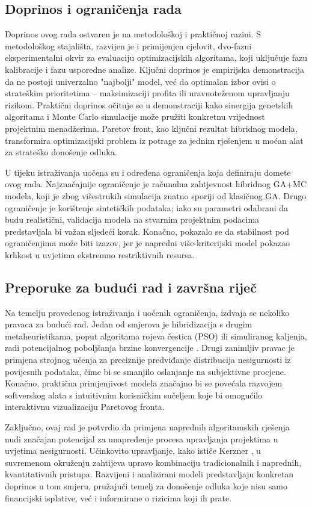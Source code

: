 \subsection{Doprinos i ograničenja rada}

Doprinos ovog rada ostvaren je na metodološkoj i praktičnoj razini. S metodološkog stajališta, razvijen je i primijenjen cjelovit, dvo-fazni eksperimentalni okvir za evaluaciju optimizacijskih algoritama, koji uključuje fazu kalibracije i fazu usporedne analize. Ključni doprinos je empirijska demonstracija da ne postoji univerzalno "najbolji" model, već da optimalan izbor ovisi o strateškim prioritetima – maksimizaciji profita ili uravnoteženom upravljanju rizikom. Praktični doprinos očituje se u demonstraciji kako sinergija genetskih algoritama i Monte Carlo simulacije može pružiti konkretnu vrijednost projektnim menadžerima. Paretov front, kao ključni rezultat hibridnog modela, transformira optimizacijski problem iz potrage za jednim rješenjem u moćan alat za strateško donošenje odluka.

U tijeku istraživanja uočena su i određena ograničenja koja definiraju domete ovog rada. Najznačajnije ograničenje je računalna zahtjevnost hibridnog GA+MC modela, koji je zbog višestrukih simulacija znatno sporiji od klasičnog GA. Drugo ograničenje je korištenje sintetičkih podataka; iako su parametri odabrani da budu realistični, validacija modela na stvarnim projektnim podacima predstavljala bi važan sljedeći korak. Konačno, pokazalo se da stabilnost pod ograničenjima može biti izazov, jer je napredni više-kriterijski model pokazao krhkost u uvjetima ekstremno restriktivnih resursa.

\subsection{Preporuke za budući rad i završna riječ}

Na temelju provedenog istraživanja i uočenih ograničenja, izdvaja se nekoliko pravaca za budući rad. Jedan od smjerova je hibridizacija s drugim metaheuristikama, poput algoritama rojeva čestica (PSO) ili simuliranog kaljenja, radi potencijalnog poboljšanja brzine konvergencije \cite{Gandomi2013}. Drugi zanimljiv pravac je primjena strojnog učenja za preciznije predviđanje distribucija nesigurnosti iz povijesnih podataka, čime bi se smanjilo oslanjanje na subjektivne procjene. Konačno, praktična primjenjivost modela značajno bi se povećala razvojem softverskog alata s intuitivnim korisničkim sučeljem koje bi omogućilo interaktivnu vizualizaciju Paretovog fronta.

Zaključno, ovaj rad je potvrdio da primjena naprednih algoritamskih rješenja nudi značajan potencijal za unapređenje procesa upravljanja projektima u uvjetima nesigurnosti. Učinkovito upravljanje, kako ističe Kerzner \cite{Kerzner2017}, u suvremenom okruženju zahtijeva upravo kombinaciju tradicionalnih i naprednih, kvantitativnih pristupa. Razvijeni i analizirani modeli predstavljaju konkretan doprinos u tom smjeru, pružajući temelj za donošenje odluka koje nisu samo financijski isplative, već i informirane o rizicima koji ih prate.
